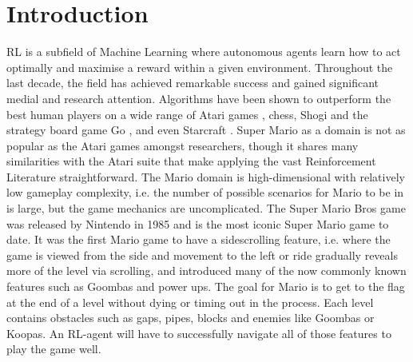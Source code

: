 \documentclass[notitlepage,a4paper,11pt]{article}
\begin{document}
\pagebreak
{}
\section{Introduction}
RL is a subfield of Machine Learning where autonomous agents learn how to act optimally and maximise a reward within a given environment. Throughout the last decade, the field has achieved remarkable success and gained significant medial and research attention. Algorithms have been shown to outperform the best human players on a wide range of Atari games \cite{DBLP:journals/corr/MnihKSGAWR13}, chess, Shogi and the strategy board game Go \cite{alpha_go}, and even Starcraft \cite{arulkumaran2019alphastar}. Super Mario as a domain is not as popular as the Atari games amongst researchers, though it shares many similarities with the Atari suite that make applying the vast Reinforcement Literature straightforward. The Mario domain is high-dimensional with relatively low gameplay complexity, i.e. the number of possible scenarios for Mario to be in is large, but the game mechanics are uncomplicated. The Super Mario Bros game was released by Nintendo in 1985 and is the most iconic Super Mario game to date. It was the first Mario game to have a sidescrolling feature, i.e. where the game is viewed from the side and movement to the left or ride gradually reveals more of the level via scrolling, and introduced many of the now commonly known features such as Goombas and power ups. The goal for Mario is to get to the flag at the end of a level without dying or timing out in the process. Each level contains obstacles such as gaps, pipes, blocks and enemies like Goombas or Koopas. An RL-agent will have to successfully navigate all of those features to play the game well.
\end{document}
